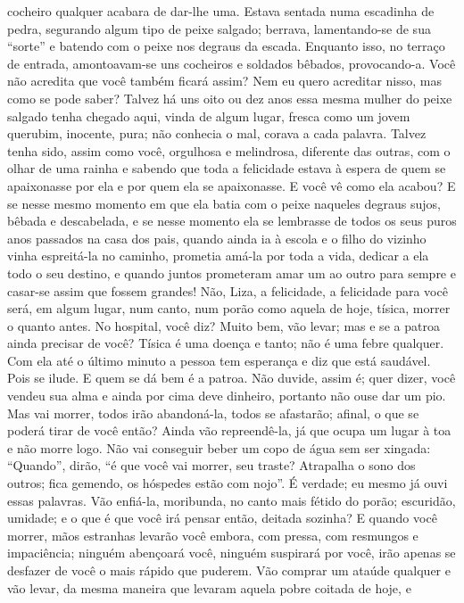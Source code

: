 cocheiro qualquer acabara de dar-lhe uma. Estava sentada numa escadinha
de pedra, segurando algum tipo de peixe salgado; berrava, lamentando-se
de sua “sorte” e batendo com o peixe nos degraus da escada. Enquanto
isso, no terraço de entrada, amontoavam-se uns cocheiros e soldados
bêbados, provocando-a. Você não acredita que você também ficará assim?
Nem eu quero acreditar nisso, mas como se pode saber? Talvez há uns oito
ou dez anos essa mesma mulher do peixe salgado tenha chegado aqui,
vinda de algum lugar, fresca como um jovem querubim, inocente, pura;
não conhecia o mal, corava a cada palavra. Talvez tenha sido, assim
como você, orgulhosa e melindrosa, diferente das outras, com o olhar de
uma rainha e sabendo que toda a felicidade estava à espera de quem se
apaixonasse por ela e por quem ela se apaixonasse. E você vê como ela
acabou? E se nesse mesmo momento em que ela batia com o peixe naqueles
degraus sujos, bêbada e descabelada, e se nesse momento ela se
lembrasse de todos os seus puros anos passados na casa dos pais, quando
ainda ia à escola e o filho do vizinho vinha espreitá-la no caminho,
prometia amá-la por toda a vida, dedicar a ela todo o seu destino, e
quando juntos prometeram amar um ao outro para sempre e casar-se assim
que fossem grandes! Não, Liza, a felicidade, a felicidade para você
será, em algum lugar, num canto, num porão como aquela de hoje, tísica,
morrer o quanto antes. No hospital, você diz? Muito bem, vão levar; mas
e se a patroa ainda precisar de você? Tísica é uma doença e tanto; não
é uma febre qualquer. Com ela até o último minuto a pessoa tem
esperança e diz que está saudável. Pois se ilude. E quem se dá bem é a
patroa. Não duvide, assim é; quer dizer, você vendeu sua alma e ainda
por cima deve dinheiro, portanto não ouse dar um pio. Mas vai morrer,
todos irão abandoná-la, todos se afastarão; afinal, o que se poderá
tirar de você então? Ainda vão repreendê-la, já que ocupa um lugar à
toa e não morre logo. Não vai conseguir beber um copo de água sem ser
xingada: “Quando”, dirão, “é que você vai morrer, seu traste? Atrapalha
o sono dos outros; fica gemendo, os hóspedes estão com nojo”. É
verdade; eu mesmo já ouvi essas palavras. Vão enfiá-la, moribunda, no
canto mais fétido do porão; escuridão, umidade; e o que é que você irá
pensar então, deitada sozinha? E quando você morrer, mãos estranhas
levarão você embora, com pressa, com resmungos e impaciência; ninguém
abençoará você, ninguém suspirará por você, irão apenas se desfazer de
você o mais rápido que puderem. Vão comprar um ataúde qualquer e vão
levar, da mesma maneira que levaram aquela pobre coitada de hoje, e
